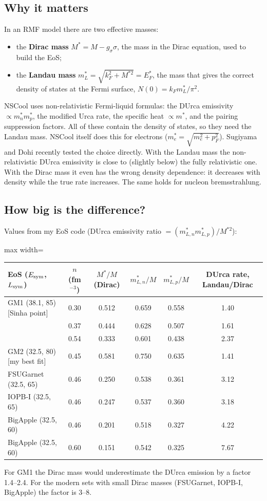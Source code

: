\documentclass[11pt,a4paper]{article}
\newcommand{\Esym}{E_{\rm sym}}
\newcommand{\Lsym}{L_{\rm sym}}
\begin{document}
\subsection{Why it matters}
In an RMF model there are two effective masses:
\begin{itemize}
\item the \textbf{Dirac mass} $M^*=M-g_\sigma\sigma$, the mass in the Dirac equation, used to build the EoS;
\item the \textbf{Landau mass} $m_L^*=\sqrt{k_F^2+M^{*2}}=E_F^*$, the mass that gives the correct density of states at the Fermi surface, $N(0)=k_F m_L^*/\pi^2$.
\end{itemize}
NSCool uses non-relativistic Fermi-liquid formulas: the DUrca emissivity $\propto m_n^*m_p^*$, the modified Urca rate, the specific heat $\propto m^*$, and the pairing suppression factors. All of these contain the density of states, so they need the Landau mass. NSCool itself does this for electrons ($m_e^*=\sqrt{m_e^2+p_F^2}$). Sugiyama and Dohi \cite{SugiyamaDohi2026} recently tested the choice directly. With the Landau mass the non-relativistic DUrca emissivity is close to (slightly below) the fully relativistic one. With the Dirac mass it even has the wrong density dependence: it decreases with density while the true rate increases. The same holds for nucleon bremsstrahlung.

\subsection{How big is the difference?}
Values from my EoS code (DUrca emissivity ratio $=(m^*_{L,n}m^*_{L,p})/M^{*2}$):
\begin{center}
\begin{adjustbox}{max width=\linewidth}
\begin{tabular}{lccccc}
\toprule
EoS ($\Esym$, $\Lsym$) & $n$ (fm$^{-3}$) & $M^*/M$ (Dirac) & $m^*_{L,n}/M$ & $m^*_{L,p}/M$ & DUrca rate, Landau/Dirac\\
\midrule
GM1 (38.1, 85) [Sinha point] & 0.30 & 0.512 & 0.659 & 0.558 & 1.40\\
 & 0.37 & 0.444 & 0.628 & 0.507 & 1.61\\
 & 0.54 & 0.333 & 0.601 & 0.438 & 2.37\\
GM2 (32.5, 80) [my best fit] & 0.45 & 0.581 & 0.750 & 0.635 & 1.41\\
FSUGarnet (32.5, 65) & 0.46 & 0.250 & 0.538 & 0.361 & 3.12\\
IOPB-I (32.5, 65) & 0.46 & 0.247 & 0.537 & 0.360 & 3.18\\
BigApple (32.5, 60) & 0.46 & 0.201 & 0.518 & 0.327 & 4.22\\
BigApple (32.5, 60) & 0.60 & 0.151 & 0.542 & 0.325 & 7.67\\
\bottomrule
\end{tabular}
\end{adjustbox}
\end{center}
For GM1 the Dirac mass would underestimate the DUrca emission by a factor 1.4--2.4. For the modern sets with small Dirac masses (FSUGarnet, IOPB-I, BigApple) the factor is 3--8.
\end{document}
